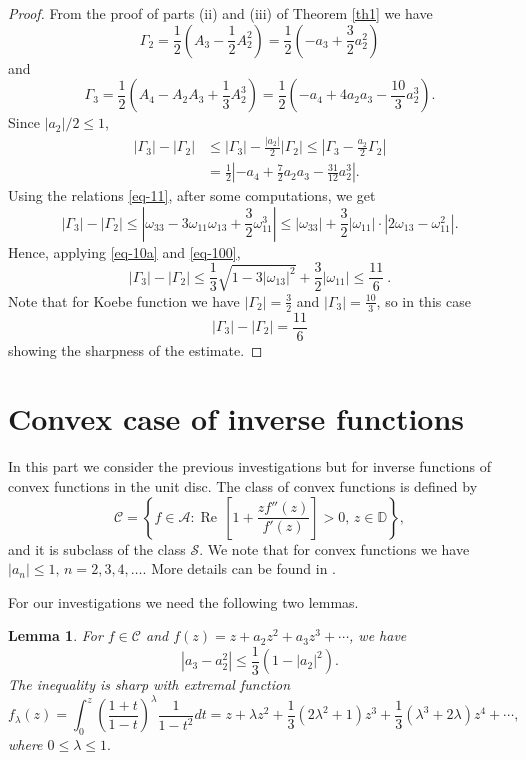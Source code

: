 \documentclass{amsart}
\newtheorem{lem}{Lemma}
\newcommand{\A}{{\mathcal A}}
\newcommand{\es}{{\mathcal S}}
\newcommand{\D}{{\mathbb D}}
\newcommand{\real}{{\operatorname{Re}\,}}
\begin{document}
\medskip

\begin{proof}
From the proof of parts (ii) and (iii) of Theorem \ref{th1} we have
$$\Gamma_{2}=\frac{1}{2}\left(A_{3}-\frac{1}{2}A_{2}^{2}\right) = \frac{1}{2}\left(-a_{3}+\frac{3}{2}a_{2}^{2}\right)$$
and
$$\Gamma_{3}=\frac{1}{2}\left(A_4-A_2A_3+\frac13A_2^3\right)=\frac{1}{2}\left(-a_{4}+4a_{2}a_{3}-\frac{10}{3}a_{2}^{3}\right).$$
Since $|a_{2}|/2\leq 1$,
\[
\begin{split}
|\Gamma_{3}|-|\Gamma_{2}|&\leq |\Gamma_{3}|-\frac{|a_{2}|}{2}|\Gamma_{2}|\leq \left|\Gamma_{3}-\frac{a_{2}}{2}\Gamma_{2}\right|\\
&=\frac{1}{2}\left|-a_{4}+\frac{7}{2}a_{2}a_{3}-\frac{31}{12}a_{2}^{3}\right|.
\end{split}
\]
Using the relations \eqref{eq-11}, after some computations, we get
$$|\Gamma_{3}|-|\Gamma_{2}|\leq \left|\omega_{33}-3\omega_{11}\omega_{13}+\frac{3}{2}\omega_{11}^{3}\right|\leq |\omega_{33}|+\frac32|\omega_{11}|\cdot|2\omega_{13}-\omega_{11}^{2}|.$$
Hence, applying \eqref{eq-10a} and \eqref{eq-100},
\[|\Gamma_{3}|-|\Gamma_{2}|\leq \frac13\sqrt{1-3|\omega_{13}|^2}+\frac32|\omega_{11}|\leq \frac{11}{6}\ .
\]
Note that for Koebe function we have $|\Gamma_{2}|=\frac32$ and $|\Gamma_{3}|=\frac{10}{3}$, so in this case
\[|\Gamma_{3}|-|\Gamma_{2}|=\frac{11}{6}\]
showing the sharpness of the estimate.
\end{proof}

\medskip

\section{Convex case of inverse functions}

\medskip

In this part we consider the previous investigations but for inverse functions of convex functions in the unit disc.
The class of convex functions is defined by
$$\mathcal{C}=\left\{ f\in\A: \real\left[1+  \frac{zf''(z)}{f'(z)}\right]>0,\,z\in\D\right\},$$
and it is subclass of the class $\es$.
We note that for convex functions we have $|a_{n}|\leq 1, \, n=2,3,4,\ldots.$
More details can be found in \cite{duren}. 

\medskip

For our investigations we need the following two lemmas.

\medskip

\begin{lem}\label{lem-1} \cite{127} For $f\in \mathcal{C}$ and $f(z)=z+a_2z^2+a_3z^3+\cdots $, we have
$$ |a_3-a_2^{2}|\leq \frac{1}{3}(1-|a_2|^{2}).$$
The inequality is sharp with extremal function
$$f_{\lambda}(z)=\int_{0}^{z}\left(\frac{1+t}{1-t}\right)^{\lambda}\frac{1}{1-t^{2}}dt=z+\lambda z^{2}
+\frac{1}{3}(2\lambda^{2}+1)z^{3}+\frac{1}{3}(\lambda^{3}+2\lambda)z^{4}+\cdots,$$
where $0\leq \lambda \leq1.$
\end{lem}
\end{document}
